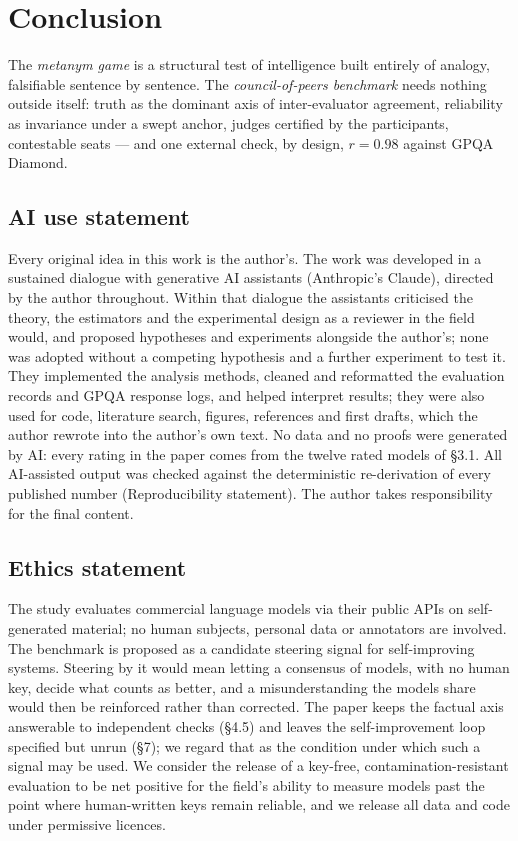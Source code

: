 \documentclass{article}
\begin{document}
\section{Conclusion}\label{conclusion}

The \emph{metanym game} is a structural test of intelligence built entirely of analogy, falsifiable sentence by sentence. The \emph{council-of-peers benchmark} needs nothing outside itself: truth as the dominant axis of inter-evaluator agreement, reliability as invariance under a swept anchor, judges certified by the participants, contestable seats --- and one external check, by design, \(r = 0.98\) against GPQA Diamond.\label{endmain}

\subsection*{AI use statement}

Every original idea in this work is the author's. The work was developed in a sustained dialogue with generative AI assistants (Anthropic's Claude), directed by the author throughout. Within that dialogue the assistants criticised the theory, the estimators and the experimental design as a reviewer in the field would, and proposed hypotheses and experiments alongside the author's; none was adopted without a competing hypothesis and a further experiment to test it. They implemented the analysis methods, cleaned and reformatted the evaluation records and GPQA response logs, and helped interpret results; they were also used for code, literature search, figures, references and first drafts, which the author rewrote into the author's own text. No data and no proofs were generated by AI: every rating in the paper comes from the twelve rated models of \S{}3.1. All AI-assisted output was checked against the deterministic re-derivation of every published number (Reproducibility statement). The author takes responsibility for the final content.

\subsection*{Ethics statement}

The study evaluates commercial language models via their public APIs on self-generated material; no human subjects, personal data or annotators are involved. The benchmark is proposed as a candidate steering signal for self-improving systems. Steering by it would mean letting a consensus of models, with no human key, decide what counts as better, and a misunderstanding the models share would then be reinforced rather than corrected. The paper keeps the factual axis answerable to independent checks (\S{}4.5) and leaves the self-improvement loop specified but unrun (\S{}7); we regard that as the condition under which such a signal may be used. We consider the release of a key-free, contamination-resistant evaluation to be net positive for the field's ability to measure models past the point where human-written keys remain reliable, and we release all data and code under permissive licences.
\end{document}
